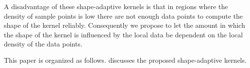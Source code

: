 A disadvantage of these shape-adaptive kernels is that in regions where the density of sample points is low there are not enough data points to compute the shape of the kernel reliably. Consequently we propose to let the amount in which the shape of the kernel is influenced by the local data be dependent on the local density of the data points.

This paper is organized as follows.  discusses the proposed shape-adaptive kernels. 